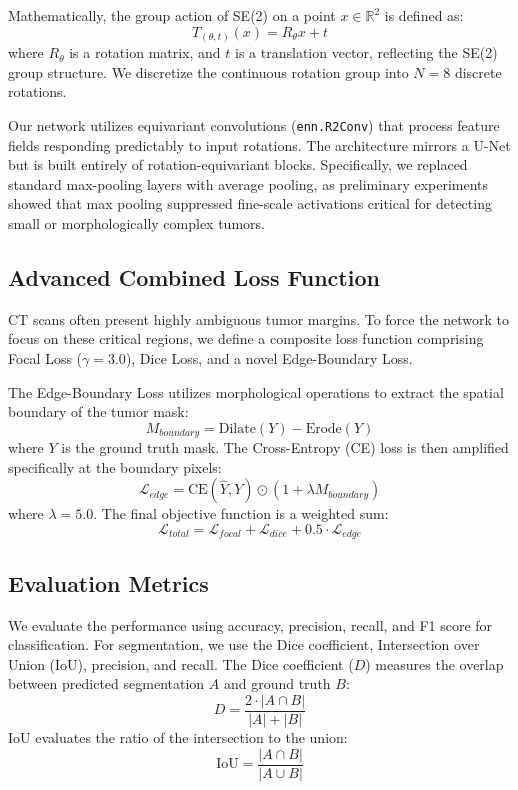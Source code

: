 Mathematically, the group action of SE(2) on a point $x \in \mathbb{R}^2$ is defined as:
\begin{equation}
    T_{(\theta,t)}(x) = R_\theta x + t
\end{equation}
where $R_\theta$ is a rotation matrix, and $t$ is a translation vector, reflecting the SE(2) group structure. We discretize the continuous rotation group into $N=8$ discrete rotations.

Our network utilizes equivariant convolutions (\texttt{enn.R2Conv}) that process feature fields responding predictably to input rotations. The architecture mirrors a U-Net but is built entirely of rotation-equivariant blocks. Specifically, we replaced standard max-pooling layers with average pooling, as preliminary experiments showed that max pooling suppressed fine-scale activations critical for detecting small or morphologically complex tumors.

\subsection{Advanced Combined Loss Function}
CT scans often present highly ambiguous tumor margins. To force the network to focus on these critical regions, we define a composite loss function comprising Focal Loss ($\gamma=3.0$), Dice Loss, and a novel Edge-Boundary Loss.

The Edge-Boundary Loss utilizes morphological operations to extract the spatial boundary of the tumor mask:
\begin{equation}
    M_{boundary} = \text{Dilate}(Y) - \text{Erode}(Y)
\end{equation}
where $Y$ is the ground truth mask. The Cross-Entropy (CE) loss is then amplified specifically at the boundary pixels:
\begin{equation}
    \mathcal{L}_{edge} = \text{CE}(\hat{Y}, Y) \odot (1 + \lambda M_{boundary})
\end{equation}
where $\lambda = 5.0$. The final objective function is a weighted sum:
\begin{equation}
    \mathcal{L}_{total} = \mathcal{L}_{focal} + \mathcal{L}_{dice} + 0.5 \cdot \mathcal{L}_{edge}
\end{equation}

\subsection{Evaluation Metrics}
We evaluate the performance using accuracy, precision, recall, and F1 score for classification. For segmentation, we use the Dice coefficient, Intersection over Union (IoU), precision, and recall. The Dice coefficient ($D$) measures the overlap between predicted segmentation $A$ and ground truth $B$:
\begin{equation}
    D = \frac{2 \cdot |A \cap B|}{|A| + |B|}
\end{equation}
IoU evaluates the ratio of the intersection to the union:
\begin{equation}
    \text{IoU} = \frac{|A \cap B|}{|A \cup B|}
\end{equation}
